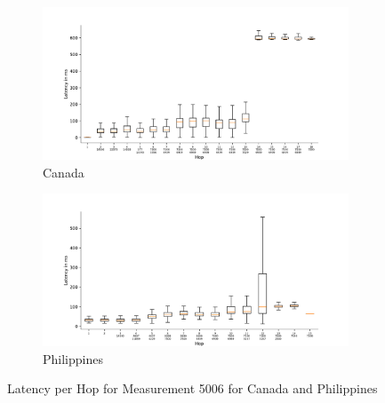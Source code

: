 \begin{figure}
	\centering
	\begin{subfigure}[b]{\linewidth}
		\includegraphics[width=\linewidth]{chapters/4-results/traceroute/img/latency-per-hop-CA-5006.pdf}
		\caption{Canada}
	\end{subfigure}
	\begin{subfigure}[b]{\linewidth}
		\includegraphics[width=\linewidth]{chapters/4-results/traceroute/img/latency-per-hop-PH-5006.pdf}
		\caption{Philippines}
	\end{subfigure}
	\caption{Latency per Hop for Measurement 5006 for Canada and
		Philippines}
	\label{fig:latency-change-per-hop-appendix-5}
\end{figure}

